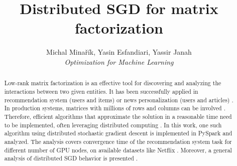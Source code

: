 \documentclass[10pt,conference,compsocconf]{IEEEtran}
\begin{document}
\title{Distributed SGD for matrix factorization}

\author{
 Michal Minařík, Yasin Esfandiari, Yassir Janah\\
 \textit{Optimization for Machine Learning}
}

\maketitle

\begin{abstract}
 Low-rank matrix factorization is an effective tool for discovering and analyzing the interactions between two given entities.
 It has been successfully applied in recommendation system (users and items) or news personalization (users and articles) \cite{gemulla11}.
 In production systems, matrices with millions of rows and columns can be involved \cite{das07}.
 Therefore, efficient algorithms that approximate the solution in a reasonable time need to be implemented, often leveraging distributed computing \cite{liu10, das07}.
 In this work, one such algorithm using distributed stochastic gradient descent \cite{gemulla11} is implemented in PySpark \cite{ZahariaXinEtAl16cacm} and analyzed. The analysis covers convergence time of the recommendation system task for different number of GPU nodes, on available datasets like Netflix \cite{Bennett07thenetflix}.
 Moreover, a general analysis of distributed SGD behavior is presented \cite{zhang17,yu21,ahn15,swenson20}. 
\end{abstract}

\end{document}
